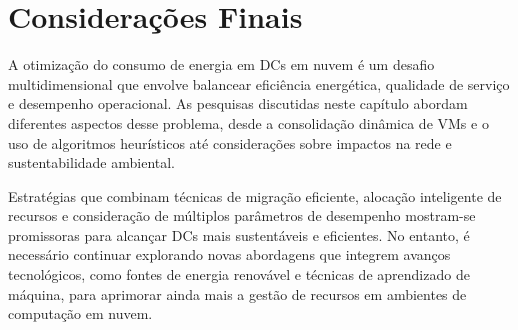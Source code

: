 \documentclass[
	12pt,				%
	oneside,			%
	a4paper,			%
	english,			%
	brazil				%
	]{abntex2ppgsi}
\begin{document}
\section{Considerações Finais}

A otimização do consumo de energia em DCs em nuvem é um desafio multidimensional que envolve balancear eficiência energética, qualidade de serviço e desempenho operacional. As pesquisas discutidas neste capítulo abordam diferentes aspectos desse problema, desde a consolidação dinâmica de VMs e o uso de algoritmos heurísticos até considerações sobre impactos na rede e sustentabilidade ambiental.

Estratégias que combinam técnicas de migração eficiente, alocação inteligente de recursos e consideração de múltiplos parâmetros de desempenho mostram-se promissoras para alcançar DCs mais sustentáveis e eficientes. No entanto, é necessário continuar explorando novas abordagens que integrem avanços tecnológicos, como fontes de energia renovável e técnicas de aprendizado de máquina, para aprimorar ainda mais a gestão de recursos em ambientes de computação em nuvem.

\postextual



%
%

\end{document}
